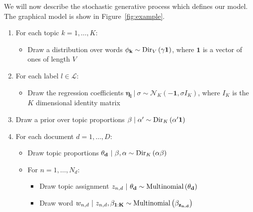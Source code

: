 \documentclass{article}
\begin{document}
We will now describe the stochastic generative process which defines our model.  The graphical model is show in Figure~\ref{fig:example}. 
%
\begin{enumerate}
	\item For each topic $k = 1,\ldots, K$:
	\begin{itemize}
		\item Draw a distribution over words $\mathbf{\phi_{k}}\sim {\rm Dir}_{V}\left(\gamma \mathbf{1}\right)$, where $\mathbf{1}$ is a vector of ones of length $V$
	\end{itemize}
	
	\item For each label $l \in \mathcal{L}$:
	\begin{itemize}
		\item Draw the regression coefficients $\mathbf{\eta_l} \ | \ \sigma \sim \mathcal{N}_{K} \left( -\mathbf{1}, \sigma I_K \right)$, where $I_K$ is the $K$ dimensional identity matrix
	\end{itemize}
	
	\item Draw a prior over topic proportions $\mathbf{\beta}\mid\alpha'\sim {\rm Dir}_{K} \left(\alpha^{\prime} \mathbf{1} \right)$ 

	\item For each document $d = 1, \ldots, D$:
	\begin{itemize} 
		\item Draw topic proportions $\mathbf{\theta_{d}} \ | \ \mathbf{\beta},\alpha \sim {\rm Dir}_{K}\left(\alpha \mathbf{\beta} \right)$ 
		\item For $n = 1, \ldots, N_d$:
		\begin{itemize}
			\item Draw topic assignment $z_{n,d} \ | \ \mathbf{\theta_{d}} \sim {\rm Multinomial} \left(\mathbf{\theta_{d}} \right)$ 
			\item Draw word $w_{n,d} \ | \ z_{n,d},\mathbf{\beta_{1:K}} \sim {\rm Multinomial} \left(\mathbf{\beta_{z_{n,d}}} \right)$ 
		\end{itemize}
		

\end{itemize}
\end{enumerate}
\end{document}
